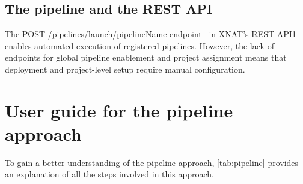 \normalsize



\subsection{The pipeline and the REST API}


The POST /pipelines/launch/pipelineName endpoint~\cite{pipelinerestapi} in XNAT's REST API1
 enables automated execution of registered pipelines. However, the lack of endpoints for global pipeline enablement and project assignment means that deployment and project-level setup require manual configuration.

\section{User guide for the pipeline approach}
To gain a better understanding of the pipeline approach, \autoref{tab:pipeline} provides an explanation of all the steps involved in this approach.
